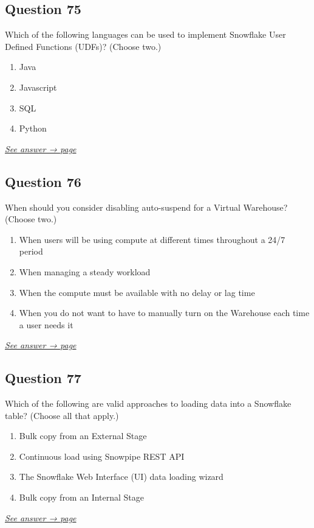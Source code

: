 \documentclass[12pt]{article}
\newcommand{\seeanswer}[1]{%
  \par\smallskip\emph{\hyperref[ans:#1]{See answer → page \pageref{ans:#1}}}%
}
\begin{document}
\subsection*{Question 75}\label{q:75}
Which of the following languages can be used to implement Snowflake User Defined Functions (UDFs)? (Choose two.)

\begin{enumerate}[label=\Alph*.]
  \item Java
  \item Javascript
  \item SQL
  \item Python
\end{enumerate}
\seeanswer{75}

\subsection*{Question 76}\label{q:76}
When should you consider disabling auto-suspend for a Virtual Warehouse? (Choose two.)

\begin{enumerate}[label=\Alph*.]
  \item When users will be using compute at different times throughout a 24/7 period
  \item When managing a steady workload
  \item When the compute must be available with no delay or lag time
  \item When you do not want to have to manually turn on the Warehouse each time a user needs it
\end{enumerate}
\seeanswer{76}

\subsection*{Question 77}\label{q:77}
Which of the following are valid approaches to loading data into a Snowflake table? (Choose all that apply.)

\begin{enumerate}[label=\Alph*.]
  \item Bulk copy from an External Stage
  \item Continuous load using Snowpipe REST API
  \item The Snowflake Web Interface (UI) data loading wizard
  \item Bulk copy from an Internal Stage
\end{enumerate}
\seeanswer{77}
\end{document}
